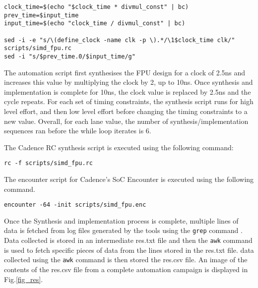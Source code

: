 \documentclass[conference]{IEEEtran}
\begin{document}
\begin{framed}
\begin{lstlisting}
clock_time=$(echo "$clock_time * divmul_const" | bc)
prev_time=$input_time
input_time=$(echo "clock_time / divmul_const" | bc)

sed -i -e "s/\(define_clock -name clk -p \).*/\1$clock_time clk/" scripts/simd_fpu.rc
sed -i "s/$prev_time.0/$input_time/g"
\end{lstlisting}
\end{framed}

The automation script first synthesises the FPU design for a clock of 2.5ns and increases this value by multiplying the clock by 2, up to 10ns. Once synthesis and implementation is complete for 10ns, the clock value is replaced by 2.5ns and the cycle repeats. For each set of timing constraints, the synthesis script runs for high level effort, and then low level effort before changing the timing constraints to a new value. Overall, for each lane value, the number of synthesis/implementation sequences ran before the while loop iterates is 6.
\newline

The Cadence RC synthesis script is executed using the following command:

\begin{framed}
\begin{verbatim}
rc -f scripts/simd_fpu.rc
\end{verbatim}
\end{framed}

The encounter script for Cadence's SoC Encounter is executed using the following command.

\begin{framed}	
\begin{verbatim}
encounter -64 -init scripts/simd_fpu.enc
\end{verbatim}
\end{framed}

Once the Synthesis and implementation process is complete, multiple lines of data is fetched from log files generated by the tools using the \texttt{grep} command \cite{grep}. Data collected is stored in an intermediate res.txt file and then the \texttt{awk} command is used to fetch specific pieces of data from the lines stored in the res.txt file. data collected using the \texttt{awk} command is then stored the res.csv file. An image of the contents of the res.csv file from a complete automation campaign is displayed in Fig.\ref{fig_res}.
\end{document}
